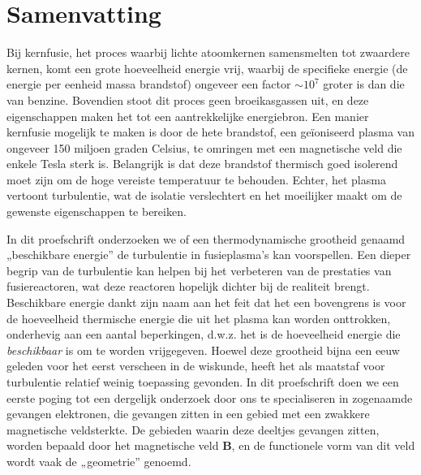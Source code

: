 \chapter*{Samenvatting}

Bij kernfusie, het proces waarbij lichte atoomkernen samensmelten tot zwaardere kernen, komt een grote hoeveelheid energie vrij, waarbij de specifieke energie (de energie per eenheid massa brandstof) ongeveer een factor $\sim 10^7$ groter is dan die van benzine. Bovendien stoot dit proces geen broeikasgassen uit, en deze eigenschappen maken het tot een aantrekkelijke energiebron. Een manier kernfusie mogelijk te maken is door de hete brandstof, een geïoniseerd plasma van ongeveer 150 miljoen graden Celsius, te omringen met een magnetische veld die enkele Tesla sterk is. Belangrijk is dat deze brandstof thermisch goed isolerend moet zijn om de hoge vereiste temperatuur te behouden. Echter, het plasma vertoont turbulentie, wat de isolatie verslechtert en het moeilijker maakt om de gewenste eigenschappen te bereiken. \par
In dit proefschrift onderzoeken we of een thermodynamische grootheid genaamd „beschikbare energie” de turbulentie in fusieplasma's kan voorspellen. Een dieper begrip van de turbulentie kan helpen bij het verbeteren van de prestaties van fusiereactoren, wat deze reactoren hopelijk dichter bij de realiteit brengt. Beschikbare energie dankt zijn naam aan het feit dat het een bovengrens is voor de hoeveelheid thermische energie die uit het plasma kan worden onttrokken, onderhevig aan een aantal beperkingen, d.w.z. het is de hoeveelheid energie die {\it beschikbaar} is om te worden vrijgegeven. Hoewel deze grootheid bijna een eeuw geleden voor het eerst verscheen in de wiskunde, heeft het als maatstaf voor turbulentie relatief weinig toepassing gevonden. In dit proefschrift doen we een eerste poging tot een dergelijk onderzoek door ons te specialiseren in zogenaamde gevangen elektronen, die gevangen zitten in een gebied met een zwakkere magnetische veldsterkte. De gebieden waarin deze deeltjes gevangen zitten, worden bepaald door het magnetische veld $\boldsymbol{B}$, en de functionele vorm van dit veld wordt vaak de „geometrie” genoemd. \par
